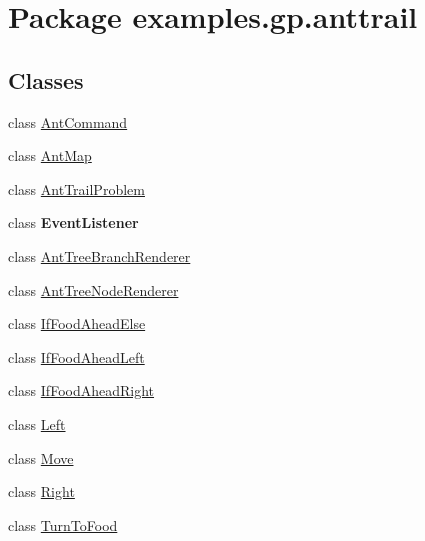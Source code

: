 \hypertarget{namespaceexamples_1_1gp_1_1anttrail}{\section{Package examples.\-gp.\-anttrail}
\label{namespaceexamples_1_1gp_1_1anttrail}
}
\subsection*{Classes}
\begin{DoxyCompactItemize}
\item 
class \hyperlink{classexamples_1_1gp_1_1anttrail_1_1_ant_command}{Ant\-Command}
\item 
class \hyperlink{classexamples_1_1gp_1_1anttrail_1_1_ant_map}{Ant\-Map}
\item 
class \hyperlink{classexamples_1_1gp_1_1anttrail_1_1_ant_trail_problem}{Ant\-Trail\-Problem}
\item 
class {\bfseries Event\-Listener}
\item 
class \hyperlink{classexamples_1_1gp_1_1anttrail_1_1_ant_tree_branch_renderer}{Ant\-Tree\-Branch\-Renderer}
\item 
class \hyperlink{classexamples_1_1gp_1_1anttrail_1_1_ant_tree_node_renderer}{Ant\-Tree\-Node\-Renderer}
\item 
class \hyperlink{classexamples_1_1gp_1_1anttrail_1_1_if_food_ahead_else}{If\-Food\-Ahead\-Else}
\item 
class \hyperlink{classexamples_1_1gp_1_1anttrail_1_1_if_food_ahead_left}{If\-Food\-Ahead\-Left}
\item 
class \hyperlink{classexamples_1_1gp_1_1anttrail_1_1_if_food_ahead_right}{If\-Food\-Ahead\-Right}
\item 
class \hyperlink{classexamples_1_1gp_1_1anttrail_1_1_left}{Left}
\item 
class \hyperlink{classexamples_1_1gp_1_1anttrail_1_1_move}{Move}
\item 
class \hyperlink{classexamples_1_1gp_1_1anttrail_1_1_right}{Right}
\item 
class \hyperlink{classexamples_1_1gp_1_1anttrail_1_1_turn_to_food}{Turn\-To\-Food}
\end{DoxyCompactItemize}
